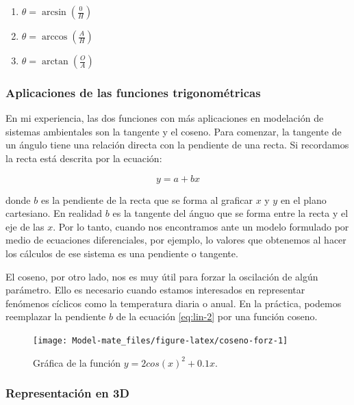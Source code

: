\documentclass[
]{book}
\providecommand{\tightlist}{%
  \setlength{\itemsep}{0pt}\setlength{\parskip}{0pt}}
\begin{document}
\begin{enumerate}
\def\labelenumi{\arabic{enumi}.}
\tightlist
\item
  \(\theta = \arcsin \left(\frac{0}{H}\right)\)
\item
  \(\theta = \arccos \left(\frac{A}{H}\right)\)
\item
  \(\theta = \arctan \left(\frac{O}{A} \right)\)
\end{enumerate}

\hypertarget{aplicaciones-de-las-funciones-trigonomuxe9tricas}{%
\subsubsection{Aplicaciones de las funciones trigonométricas}\label{aplicaciones-de-las-funciones-trigonomuxe9tricas}}

En mi experiencia, las dos funciones con más aplicaciones en modelación de sistemas ambientales son la tangente y el coseno. Para comenzar, la tangente de un ángulo tiene una relación directa con la pendiente de una recta. Si recordamos la recta está descrita por la ecuación:

\begin{equation}
    y = a + bx \label{eq:lin-2}
\end{equation}

donde \(b\) es la pendiente de la recta que se forma al graficar \(x\) y \(y\) en el plano cartesiano. En realidad \(b\) es la tangente del ánguo que se forma entre la recta y el eje de las \(x\). Por lo tanto, cuando nos encontramos ante un modelo formulado por medio de ecuaciones diferenciales, por ejemplo, lo valores que obtenemos al hacer los cálculos de ese sistema es una pendiente o tangente.

El coseno, por otro lado, nos es muy útil para forzar la oscilación de algún parámetro. Ello es necesario cuando estamos interesados en representar fenómenos cíclicos como la temperatura diaria o anual. En la práctica, podemos reemplazar la pendiente \(b\) de la ecuación \eqref{eq:lin-2} por una función coseno.

\begin{figure}

{\centering \texttt{[image: Model-mate\_files/figure-latex/coseno-forz-1]} 

}

\caption{Gráfica de la función $y = 2 cos(x)^2 + 0.1  x$.}\label{fig:coseno-forz}
\end{figure}

\hypertarget{representaciuxf3n-en-3d}{%
\subsubsection{Representación en 3D}\label{representaciuxf3n-en-3d}}
\end{document}
